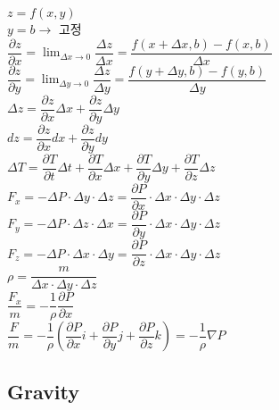 $z = f \left( x, y \right) $ \\
$y = b \rightarrow $ 고정 \\


$\dfrac{\partial z}{\partial x} = \displaystyle \lim_{\Delta x \rightarrow 0} \dfrac { \Delta z}{\Delta x } 
= \dfrac {f\left(x + \Delta x, b \right) - f\left(x, b \right)}{ \Delta x}$\\

$\dfrac{\partial z}{\partial y} = \displaystyle \lim_{\Delta y \rightarrow 0} \dfrac { \Delta z}{\Delta y } 
= \dfrac {f\left(y + \Delta y, b \right) - f\left(y, b \right)}{ \Delta y}$\\

$ \Delta z = \dfrac{\partial z}{\partial x} \Delta x + \dfrac{\partial z}{\partial y} \Delta y $\\

$ dz = \dfrac{\partial z}{\partial x} dx + \dfrac{\partial z}{\partial y} dy $\\


$ \Delta T = \dfrac{\partial T}{\partial t} \Delta t 
+ \dfrac{\partial T}{\partial x} \Delta x 
+ \dfrac{\partial T}{\partial y} \Delta y 
+ \dfrac{\partial T}{\partial z} \Delta z $\\

$ F_{x} = - \Delta P \cdot \Delta y \cdot \Delta z 
= \dfrac{\partial P}{\partial x} \cdot \Delta x \cdot \Delta y \cdot \Delta z $\\

$ F_{y} = - \Delta P \cdot \Delta z \cdot \Delta x 
= \dfrac{\partial P}{\partial y} \cdot \Delta x \cdot \Delta y \cdot \Delta z $\\

$ F_{z} = - \Delta P \cdot \Delta x \cdot \Delta y 
= \dfrac{\partial P}{\partial z} \cdot \Delta x \cdot \Delta y \cdot \Delta z $\\

$ \rho = \dfrac {m}{\Delta x \cdot \Delta y \cdot \Delta z} $ \\

$ \dfrac {F_{x}}{m} = - \dfrac{1}{\rho} \dfrac{\partial P}{\partial x} $ \\

$ \dfrac {F}{m} = - \dfrac{1}{\rho} \left( \dfrac{\partial P}{\partial x} i + \dfrac{\partial P}{\partial y} j + \dfrac{\partial P}{\partial z} k \right) 
= - \dfrac{1}{\rho} \nabla P$ \\


\subsection{Gravity}\

